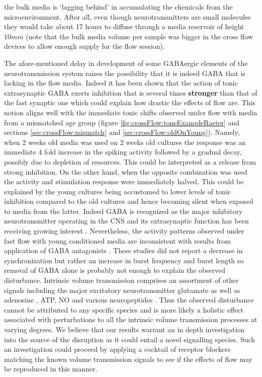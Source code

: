 the bulk media is `lagging behind' in accumulating the chemicals from the microenvironment. After all, even though neurotransmitters are small molecules they would take about 17 hours to diffuse through a media reservoir of height \(10 mm\) (note that the bulk media volume per sample was bigger in the cross flow devices to allow enough supply for the flow session).

The afore-mentioned delay in development of some GABAergic elements of the neurotransmission system raises the possibility that it is indeed GABA that is lacking in the flow media. Indeed it has been shown that the action of tonic extrasynaptic GABA exerts inhibition that is several times \textbf{stronger} than that of the fast synaptic one \cite{farrant2005variations,mody2004diversity} which could explain how drastic the effects of flow are. This notion aligns well with the immediate tonic shifts observed under flow with media from a mismatched age group (figure \ref{fig:crossFlow:toneExampleRaster} and sections \ref{sec:crossFlow:mismatch} and \ref{sec:crossFlow:oldOnYoung}). Namely, when 2 weeks old media was used on 2 weeks old cultures the response was an immediate 4 fold increase in the spiking activity followed by a gradual decay, possibly due to depletion of resources. This could be interpreted as a release from strong inhibition. On the other hand, when the opposite combination was used the activity and stimulation response were immediately halved. This could be explained by the young cultures being accustomed to lower levels of tonic inhibition compared to the old cultures and hence becoming silent when exposed to media from the latter. Indeed GABA is recognized as the major inhibitory neurotransmitter operating in the CNS and its extrasynaptic function has been receiving growing interest \cite{mody2004diversity,lee2010channel,olah2009regulation}. Nevertheless, the activity patterns observed under fast flow with young conditioned media are inconsistent with results from application of GABA antagonists \cite{bikbaev2015brain,li2007long}. These studies did not report a decrease in synchronization but rather an increase in burst frequency and burst length so removal of GABA alone is probably not enough to explain the observed disturbance. Intrinsic volume transmission comprises an assortment of other signals including the major excitatory neurotransmitter glutamate \cite{cavelier2005tonic} as well as adenosine \cite{wall2015localized}, ATP, NO and various neuropeptides \cite{fuxe2010discovery,taber2014volume}. Thus the observed disturbance cannot be attributed to any specific species and is more likely a holistic effect associated with perturbations to all the intrinsic volume transmission processes at varying degrees. We believe that our results warrant an in depth investigation into the source of the disruption as it could entail a novel signalling species. Such an investigation could proceed by applying a cocktail of receptor blockers matching the known volume transmission signals to see if the effects of flow may be reproduced in this manner.


